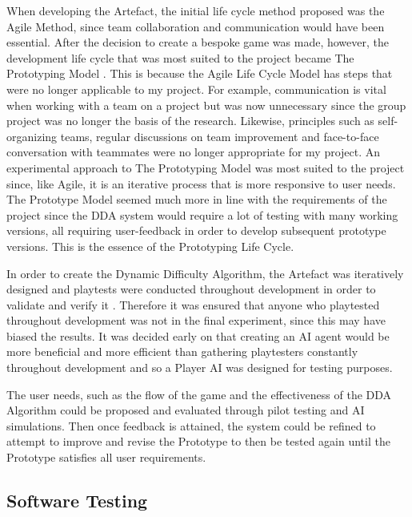 \documentclass[journal]{IEEEtran}
\begin{document}
When developing the Artefact, the initial life cycle method proposed was the Agile Method, since team collaboration and communication would have been essential. After the decision to create a bespoke game was made, however, the development life cycle that was most suited to the project became The Prototyping Model \cite{isaias2015information}. This is because the Agile Life Cycle Model has steps that were no longer applicable to my project. For example, communication is vital when working with a team on a project but was now unnecessary since the group project was no longer the basis of the research. Likewise, principles such as self-organizing teams, regular discussions on team improvement and face-to-face conversation with teammates were no longer appropriate for my project. An experimental approach to The Prototyping Model was most suited to the project since, like Agile, it is an iterative process that is more responsive to user needs. The Prototype Model seemed much more in line with the requirements of the project since the DDA system would require a lot of testing with many working versions, all requiring user-feedback in order to develop subsequent prototype versions. This is the essence of the Prototyping Life Cycle.


In order to create the Dynamic Difficulty Algorithm, the Artefact was iteratively designed and playtests were conducted throughout development in order to validate and verify it \cite{fullerton2004game}. Therefore it was ensured that anyone who playtested throughout development was not in the final experiment, since this may have biased the results. It was decided early on that creating an AI agent would be more beneficial and more efficient than gathering playtesters constantly throughout development and so a Player AI was designed for testing purposes.

The user needs, such as the flow of the game and the effectiveness of the DDA Algorithm could be proposed and evaluated through pilot testing and AI simulations. Then once feedback is attained, the system could be refined to attempt to improve and revise the Prototype to then be tested again until the Prototype satisfies all user requirements.

\subsection{Software Testing}
\end{document}
